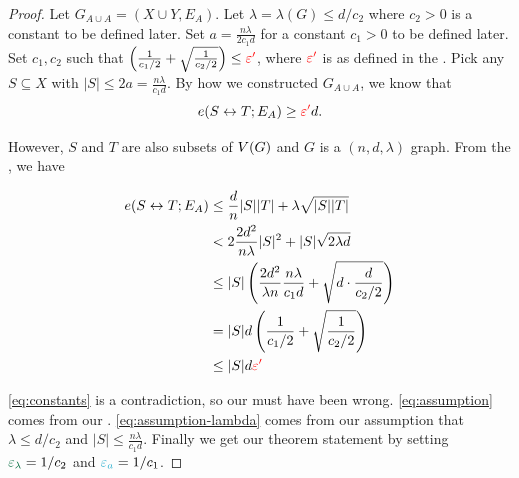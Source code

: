 \documentclass[11pt]{article}
\newcommand{\EnDeeLambda}{(n, d, \lambda)}
\newcommand{\epsilonA}{\textcolor{ballblue}{\epsilon_a}}
\newcommand{\epsilonL}{\textcolor{cadmiumgreen}{\epsilon_\lambda}}
\newcommand{\BipartiteG}{G_{A \cup A}}
\newcommand{\ExpansionFactor}[1]{\lambda(#1)}
\begin{document}
\begin{proof}
Let $\BipartiteG = (X \cup Y, E_A)$. 
Let $\lambda = \ExpansionFactor{G} \leq d/c_2$ where $c_2 > 0$ is a constant to be defined later.
Set $a = \frac{n\lambda}{2c_1 d}$ for a constant $c_1 > 0$ to be defined later.
Set $c_1, c_2$ such that $\left(\frac{1}{c_1/2}  + \sqrt{\frac{1}{c_2/2}}\right) \leq \textcolor{red}{\varepsilon'}$, where $\textcolor{red}{\varepsilon'}$ is as defined in the .
Pick any $S \subseteq X$ with $|S| \leq 2a = \frac{n\lambda}{c_1 d}$.
By how we constructed $\BipartiteG$, we know that
\[ e(S \leftrightarrow T; E_A) \geq \textcolor{red}{\varepsilon'} d.\]

However, $S$ and $T$ are also subsets of $V(G)$ and $G$ is a $\EnDeeLambda$ graph.
From the , we have

\begin{align}
	e(S \leftrightarrow T; E_A) &\leq \frac{d}{n}|S||T| + \lambda\sqrt{|S||T|} \\
	&< 2\frac{2d^2}{n\lambda}|S|^2 + |S|\sqrt{2\lambda d} \label{eq:assumption}\\
	&\leq |S|\left(\frac{2d^2}{\lambda n} \frac{n\lambda}{c_1 d} + \sqrt{d\cdot \frac{d}{c_2/2}}\right) \label{eq:assumption-lambda}\\
	&= |S|d\left(\frac{1}{c_1/2}  + \sqrt{\frac{1}{c_2/2}}\right) \\
	&\leq |S|d\textcolor{red}{\varepsilon'} \label{eq:constants}
\end{align}


\eqref{eq:constants} is a contradiction, so our  must have been wrong.
\eqref{eq:assumption} comes from our .
\eqref{eq:assumption-lambda} comes from our assumption that $\lambda \leq d/c_2$ and $|S| \leq \frac{n\lambda}{c_1 d}$.
Finally we get our theorem statement by setting $\epsilonL = 1/c_2$ and $\epsilonA = 1/c_1$.


\end{proof}
\end{document}
